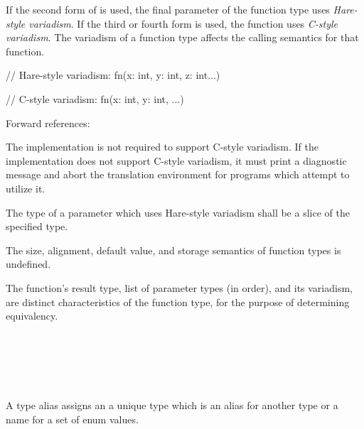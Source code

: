 \specsubsubitem
If the second form of  is used, the final parameter of
the function type uses \textit{Hare-style variadism}. If the third or fourth
form is used, the function uses \textit{C-style variadism}. The variadism of a
function type affects the calling semantics for that function.

\begin{codesample}
// Hare-style variadism:
fn(x: int, y: int, z: int...)

// C-style variadism:
fn(x: int, y: int, ...)
\end{codesample}

Forward references: 

\specsubsubitem
The implementation is not required to support C-style variadism. If the
implementation does not support C-style variadism, it must print a diagnostic
message and abort the translation environment for programs which attempt to
utilize it.

\specsubsubitem
The type of a parameter which uses Hare-style variadism shall be a slice of the
specified type.


\specsubsubitem
The size, alignment, default value, and storage semantics of function types is
undefined.

\specsubsubitem
The function's result type, list of parameter types (in order), and its
variadism, are distinct characteristics of the function type, for the purpose of
determining equivalency.


\begin{grammar}
 \\
	 \\

 \\
	  \\
\end{grammar}

\specsubsubitem
A type alias assigns an  a unique type which is an
alias for another type or a name for a set of enum values.


